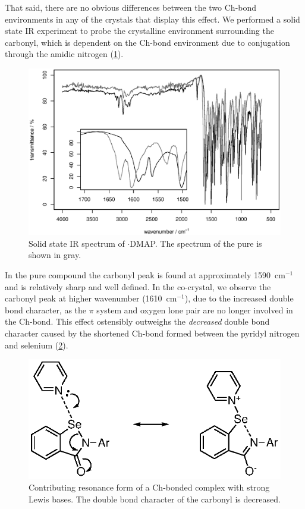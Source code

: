\begin{refsection}
That said, there are no obvious differences between the two Ch-bond environments in any of the crystals that display this effect.
We performed a solid state IR experiment to probe the crystalline environment surrounding the carbonyl, which is dependent on the Ch-bond environment due to conjugation through the amidic nitrogen (\cref{fig:ebs-4oet-dmap-ir}).

\begin{figure}
    \centering
    \includegraphics[width=0.9\linewidth]{Figures/ebs-4oet-dmap-ir.eps}
    \caption[Solid state IR spectrum of $\cdot$DMAP.]{Solid state IR spectrum of $\cdot$DMAP. The spectrum of the pure  is shown in gray.}
    \label{fig:ebs-4oet-dmap-ir}
\end{figure}

In the pure compound the carbonyl peak is found at approximately 1590~cm$^{-1}$ and is relatively sharp and well defined.
In the co-crystal, we observe the carbonyl peak at higher wavenumber (1610~cm$^{-1}$), due to the increased double bond character, as the $\pi$ system and oxygen lone pair are no longer involved in the Ch-bond.
This effect ostensibly outweighs the \emph{decreased} double bond character caused by the shortened Ch-bond formed between the pyridyl nitrogen and selenium (\cref{fig:ch-bond-deloc}).

\begin{figure}
    \centering
    \includegraphics[scale=0.74]{Figures/ch-bond-deloc.eps}
    \caption[Resonance forms of a Ch-bonded complex with strong Lewis bases.]{Contributing resonance form of a Ch-bonded complex with strong Lewis bases. The double bond character of the carbonyl is decreased.}
    \label{fig:ch-bond-deloc}
\end{figure}


\end{refsection}
